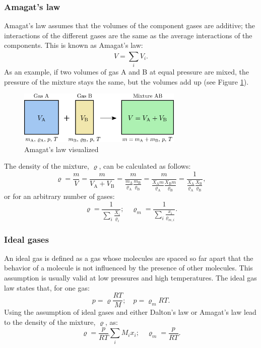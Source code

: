 \subsubsection{Amagat's law}
Amagat's law assumes that the volumes of the component gases are additive; the interactions of the different gases are the same as the average interactions of the components. This is known as Amagat's law:
%
\begin{equation}
V = \sum_{i}^{}V_i.
\end{equation}
%
As an example, if two volumes of gas A and B at equal pressure are mixed, the pressure of the mixture stays the same, but the volumes add up (see Figure \ref{fig:dalton2}).
%
\begin{figure}[ht]
	\centering
	\includegraphics[width=0.7\textwidth]{png/dalton2.png}
	\caption{Amagat's law visualized}
	\label{fig:dalton2}
\end{figure}
%
The density of the mixture, $\varrho$, can be calculated as follows:
\begin{equation}
\varrho = \frac{m}{V} = \frac{m}{V_\mathrm{A} + V_\mathrm{B}} = \frac{m}{\frac{m_\mathrm{A}}{\varrho_\mathrm{A}} \frac{m_\mathrm{B}}{\varrho_\mathrm{B}}} =
\frac{m}{\frac{X_\mathrm{A} m}{\varrho_\mathrm{A}} \frac{X_\mathrm{B} m}{\varrho_\mathrm{B}}} = \frac{1}{\frac{X_\mathrm{A}}{\varrho_\mathrm{A}} \frac{X_\mathrm{B}}{\varrho_\mathrm{B}}},
\end{equation}
%
or for an arbitrary number of gases:
%
\begin{equation}
\varrho = \frac{1}{\sum_{i}^{}\frac{X_i}{\varrho_i}}  ; \quad  \varrho_m = \frac{1}{\sum_{i}^{}\frac{x_i}{\varrho_{m,i}}}.
\end{equation}
%
\subsubsection{Ideal gases}
An ideal gas is defined as a gas whose molecules are spaced so far apart that the behavior of a molecule is not influenced by the presence of other molecules.
This assumption is usually valid at low pressures and high temperatures. The ideal gas law states that, for one gas:
%
\begin{equation}
p = \varrho \frac{RT}{M} ; \quad p= \varrho_m RT.
\end{equation}
%
Using the assumption of ideal gases and either Dalton's law or Amagat's law lead to the density of the mixture, $\varrho$, as:
%
\begin{equation}
\varrho = \frac{p}{RT} \sum_{i}^{}M_i x_i ; \quad \varrho_m = \frac{p}{RT}.
\end{equation}
%
